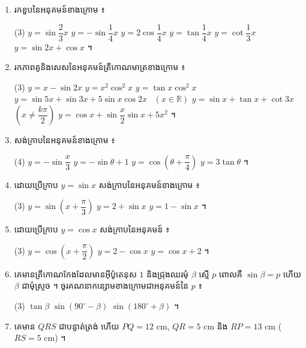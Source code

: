 \begin{enumerate}[1]
\begin{tasks}
    \task $\dfrac{2\sin\theta\cos\theta - \cos\theta}{1 - \sin\theta + \sin^2\theta - \cos^2\theta} = \dfrac{1}{\tan\theta}$ ។
  \end{tasks}
  \item រកខួបនៃអនុគមន៍ខាងក្រោម ៖
  \begin{tasks}(3)
    \task $y = \sin\dfrac{2}{3}x$
    \task $y = -\sin\dfrac{1}{4}x$
    \task $y = 2\cos\dfrac{1}{4}x$
    \task $y = \tan\dfrac{1}{4}x$
    \task $y = \cot\dfrac{1}{3}x$
    \task $y = \sin 2x + \cos x$ ។
  \end{tasks}
  \item រកភាពគូនិងសេសនៃអនុគមន៍ត្រីកោណមាត្រខាងក្រោម ៖
  \begin{tasks}(3)
    \task $y = x - \sin 2x$
    \task $y = x^2\cos^2 x$
    \task $y = \tan x\cos^2 x$
    \task* $y = \sin 5x + \sin 3x + 5\sin x\cos 2x$ \ $(x \in \mathbb{R})$
    \task* $y = \sin x + \tan x + \cot 3x$ \ $\left(x \ne \dfrac{k\pi}{2}\right)$
    \task* $y = \cos x + \sin\dfrac{x}{2}\sin x + 5x^2$ ។
  \end{tasks}
  \item សង់ក្រាបនៃអនុគមន៍ខាងក្រោម ៖
  \begin{tasks}(4)
    \task $y = -\sin\dfrac{x}{3}$
    \task $y = -\sin\theta + 1$
    \task $y = \cos\left(\theta + \dfrac{\pi}{4}\right)$
    \task $y = 3\tan\theta$ ។
  \end{tasks}
  \item ដោយប្រើក្រាប $y = \sin x$ សង់ក្រាបនៃអនុគមន៍ខាងក្រោម ៖
  \begin{tasks}(3)
    \task $y = \sin\left(x + \dfrac{\pi}{3}\right)$
    \task $y = 2 + \sin x$
    \task $y = 1 - \sin x$ ។
  \end{tasks}
  \item ដោយប្រើក្រាប $y = \cos x$ សង់ក្រាបនៃអនុគមន៍ ៖
  \begin{tasks}(3)
    \task $y = \cos\left(x + \dfrac{\pi}{2}\right)$
    \task $y = 2 - \cos x$
    \task $y = \cos x + 2$ ។
  \end{tasks}
  \item គេមានត្រីកោណកែងដែលមានអ៊ីប៉ូតេនុស $1$ និងជ្រុងឈរមុំ $\beta$ ស្មើ $p$ ពោលគឺ $\sin\beta = p$ ហើយ $\beta$ ជាមុំស្រួច ។ ចូរគណនាកន្សោមខាងក្រោមជាអនុគមន៍នៃ $p$ ៖
  \begin{tasks}(3)
    \task $\tan\beta$
    \task $\sin(90^\circ - \beta)$
    \task $\sin(180^\circ + \beta)$ ។
  \end{tasks}
  \item គេមាន $QRS$ ជាបន្ទាត់ត្រង់ ហើយ $PQ = 12$ cm, $QR = 5$ cm និង $RP = 13$ cm ($RS = 5$ cm) ។

\end{enumerate}
